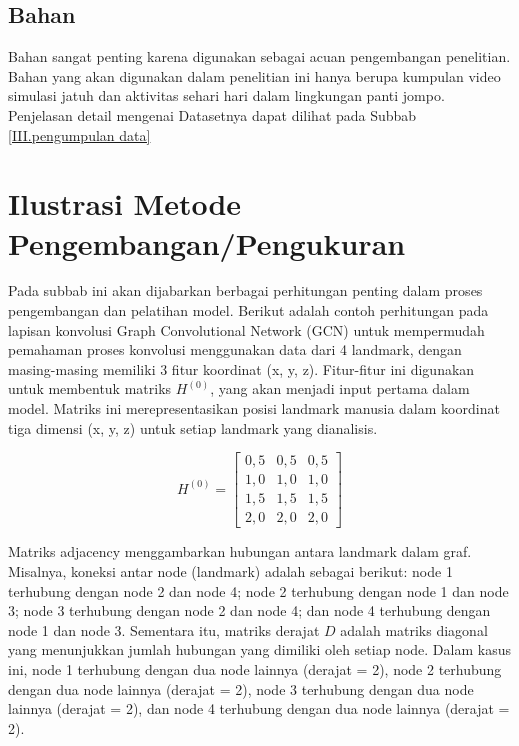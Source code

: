 \subsection{Bahan} \label{III.bahan}
Bahan sangat penting karena digunakan sebagai acuan pengembangan penelitian. Bahan yang akan digunakan dalam penelitian ini hanya berupa kumpulan video simulasi jatuh dan aktivitas sehari hari dalam lingkungan panti jompo. Penjelasan detail mengenai Datasetnya dapat dilihat pada Subbab \ref{III.pengumpulan data} \par

\section{Ilustrasi Metode Pengembangan/Pengukuran} \label{III.ilustrasi metode}
Pada subbab ini akan dijabarkan berbagai perhitungan penting dalam proses pengembangan dan pelatihan model. Berikut adalah contoh perhitungan pada lapisan konvolusi Graph Convolutional Network (GCN) untuk mempermudah pemahaman proses konvolusi menggunakan data dari 4 landmark, dengan masing-masing memiliki 3 fitur koordinat (x, y, z). Fitur-fitur ini digunakan untuk membentuk matriks $H^{(0)}$, yang akan menjadi input pertama dalam model. Matriks ini merepresentasikan posisi landmark manusia dalam koordinat tiga dimensi (x, y, z) untuk setiap landmark yang dianalisis. \par
\vspace{0.3cm}
\[
H^{(0)} = 
\begin{bmatrix}
0,5 & 0,5 & 0,5 \\
1,0 & 1,0 & 1,0 \\
1,5 & 1,5 & 1,5 \\
2,0 & 2,0 & 2,0
\end{bmatrix}
\]
\vspace{0.5cm}\par
Matriks adjacency menggambarkan hubungan antara landmark dalam graf. Misalnya, koneksi antar node (landmark) adalah sebagai berikut: node 1 terhubung dengan node 2 dan node 4; node 2 terhubung dengan node 1 dan node 3; node 3 terhubung dengan node 2 dan node 4; dan node 4 terhubung dengan node 1 dan node 3. Sementara itu, matriks derajat $D$ adalah matriks diagonal yang menunjukkan jumlah hubungan yang dimiliki oleh setiap node. Dalam kasus ini, node 1 terhubung dengan dua node lainnya (derajat = 2), node 2 terhubung dengan dua node lainnya (derajat = 2), node 3 terhubung dengan dua node lainnya (derajat = 2), dan node 4 terhubung dengan dua node lainnya (derajat = 2).\par
